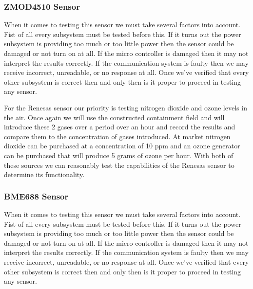\subsubsection{ZMOD4510 Sensor}
When it comes to testing this sensor we must take several factors into account. Fist of all every subsystem must be tested before this. If it turns out the power subsystem is providing too much or too little power then the sensor could be damaged or not turn on at all. If the micro controller is damaged then it may not interpret the results correctly. If the communication system is faulty then we may receive incorrect, unreadable, or no response at all. Once we've verified that every other subsystem is correct then and only then is it proper to proceed in testing any sensor.

For the Renesas sensor our priority is testing nitrogen dioxide and ozone levels in the air. Once again we will use the constructed containment field and will introduce these 2 gases over a period over an hour and record the results and compare them to the concentration of gases introduced. At market nitrogen dioxide can be purchased at a concentration of 10 ppm and an ozone generator can be purchased that will produce 5 grams of ozone per hour. With both of these sources we can reasonably test the capabilities of the Renesas sensor to determine its functionality.

\subsubsection{BME688 Sensor}
When it comes to testing this sensor we must take several factors into account. Fist of all every subsystem must be tested before this. If it turns out the power subsystem is providing too much or too little power then the sensor could be damaged or not turn on at all. If the micro controller is damaged then it may not interpret the results correctly. If the communication system is faulty then we may receive incorrect, unreadable, or no response at all. Once we've verified that every other subsystem is correct then and only then is it proper to proceed in testing any sensor.

